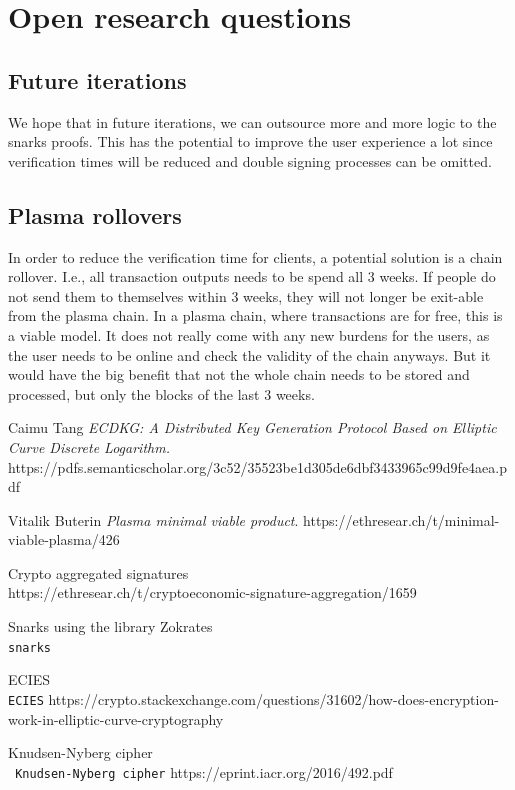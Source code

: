 \documentclass[11pt,parskip=full]{scrartcl}%
\begin{document}
\section{Open research questions}

\subsection{Future iterations}
We hope that in future iterations, we can outsource more and more logic to the snarks proofs. This has the potential to improve the user experience a lot since verification times will be reduced and double signing processes can be omitted.

\subsection{Plasma rollovers}
In order to reduce the verification time for clients, a potential solution is a chain rollover. I.e., all transaction outputs needs to be spend all 3 weeks. If people do not send them to themselves within 3 weeks, they will not longer be exit-able from the plasma chain. In a plasma chain, where transactions are for free, this is a viable model. It does not really come with any new burdens for the users, as the user needs to be online and check the validity of the chain anyways.\newline
But it would have the big benefit that not the whole chain needs to be stored and processed, but only the blocks of the last 3 weeks.



\begin{thebibliography}{9}
Caimu Tang
\textit{ECDKG: A Distributed Key Generation Protocol Based on Elliptic
Curve Discrete Logarithm.}  
https://pdfs.semanticscholar.org/3c52/35523be1d305de6dbf3433965c99d9fe4aea.pdf
 
Vitalik Buterin
\textit{Plasma minimal viable product}. 
https://ethresear.ch/t/minimal-viable-plasma/426
 
Crypto aggregated signatures
\\\texttt{}
https://ethresear.ch/t/cryptoeconomic-signature-aggregation/1659

Snarks using the library Zokrates
\\\texttt{snarks}

ECIES
\\\texttt{ECIES}
https://crypto.stackexchange.com/questions/31602/how-does-encryption-work-in-elliptic-curve-cryptography

Knudsen-Nyberg cipher
\\\texttt{ Knudsen-Nyberg cipher}
https://eprint.iacr.org/2016/492.pdf

\end{thebibliography}
\end{document}
